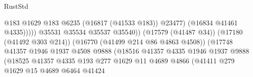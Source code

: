 \begin{lexlean}{RustStd}
\begin{coremodule}
{\begin{coremodule}
{{{{{{{{{{{{{{{{{{{{{{{{{{{{{{{{{{{{{{{{{{{{{{{{{{{{{{{                                                              @183
                                                              @1629
                                                              @183
                                                              @6235
                                                              (@16817 (@41533 @183))
                                                              @23477)
                                                            (@16834 @41461 @4335)))))
                                                    @35531
                                                    @35534
                                                    @35537
                                                    @35540))
                                                (@17579 (@41487 @34))
                                                (@17180 (@41492 @303 @214))
                                                (@16770 (@41499 @214 @86 @4863 @4508))
                                                (@17748
                                                  @41357
                                                  @1946
                                                  @1937
                                                  @4508
                                                  @9888
                                                  (@18516
                                                    @41357
                                                    @4335
                                                    @1946
                                                    @1937
                                                    @9888
                                                    (@18525
                                                      @41357
                                                      @4335
                                                      @193
                                                      @277
                                                      @1629
                                                      @11
                                                      @4689
                                                      @4866
                                                      (@41411
                                                        @279
                                                        @1629
                                                        @15
                                                        @4689
                                                        @6464
                                                        @41424
}}}}}}}}}}}}}}}}}}}}}}}}}}}}}}}}}}}}}}}}}}}}}}}}}}}}}}}
\end{coremodule}}
\end{coremodule}
\end{lexlean}
